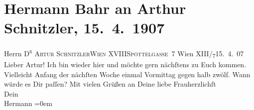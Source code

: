 

         
         \renewcommand{\erwaehntePersonen}{Personen: Olga Schnitzler}
         \renewcommand{\erwaehnteOrte}{Orte: Edmund-Weiß-Gasse 7, Ober Sankt Veit, Wien, XIII., Hietzing, XVIII., Währing}
         \renewcommand{\erwaehnteWerke}{}
               \section[Hermann Bahr an Arthur Schnitzler, 15. 4. 1907]{ Hermann Bahr an Arthur Schnitzler, 15. 4. 1907}\nopagebreak{}\rehead{ }\begin{ledgroupsized}[t]{13cm}\normalsize\beginnumbering \toendnotes[C]{\smallbreak\pagebreak[2]} 
\toendnotes[C]{\smallbreak}\pstart{}{\pb}Herrn \textsc{D\textsuperscript{r} Artur Schnitzler}\pend{}\pstart{}\textsc{Wien XVIII}\pend{}\pstart{}\textsc{Spöttelgasse 7}\pend{}{\bigskip}\pstart
           \raggedleft{}{\pb}Wien XIII/\textsubscript{7}15. 4. 07\pend
           \pstart{}Lieber Artur!\pend\pstart
           Ich bin wieder hier und möchte gern nächſtens zu Euch kommen. Vielleicht Anfang der
               nächſten Woche einmal Vormittag gegen halb zwölf. Wann würde es Dir paſſen?\pend
           \pstart
           Mit vielen Grüßen an Deine liebe Frauherzlichſt{\\[\baselineskip]}Dein{\\[\baselineskip]}\spacefill\mbox{Hermann}\pend
           \leftskip=0em{}
         
         \endnumbering{}\end{ledgroupsized}  \newcommand{\dateiname}{L01668}\newcommand{\titel}{Hermann Bahr an Arthur Schnitzler, 15. 4. 1907}\newcommand{\editorInnen}{ Kurt Ifkovits,  Martin Anton Müller}
      